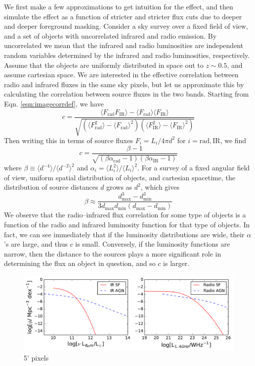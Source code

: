 \documentclass{emulateapj}
\newcommand{\mintext}{\text{min}}
\newcommand{\maxtext}{\text{max}}
\newcommand{\rad}{\text{rad}}
\newcommand{\ir}{\text{IR}}
\begin{document}
We first make a few approximations to get intuition for the effect, and then simulate the effect as a function of stricter and stricter flux cuts due to deeper and deeper foreground masking. Consider a sky survey over a fixed field of view, and a set of objects with uncorrelated infrared and radio emission. By uncorrelated we mean that the infrared and radio luminosities are independent random variables determined by the infrared and radio luminosities, respectively. Assume that the objects are uniformly distributed in space out to $z\sim0.5$, and assume cartesian space. We are interested in the effective correlation between radio and infrared fluxes in the same sky pixels, but let us approximate this by calculating the correlation between source fluxes in the two bands. Starting from Eqn. \ref{eqn:imagecorrdef}, we have
\begin{equation} %
	c = \frac{\langle F_\rad F_\ir \rangle-\langle F_\rad\rangle\langle F_\ir\rangle}{\sqrt{(\langle F_\rad^2\rangle-\langle F_\rad\rangle^2)(\langle F_\ir^2\rangle-\langle F_\ir\rangle^2)}}
\end{equation}
Then writing this in terms of source fluxes $F_i=L_i/4\pi d^2$ for $i=\rad,\ir$, we find
\begin{equation}
	c = \frac{\beta-1}{\sqrt{(\beta\alpha_\rad-1)(\beta\alpha_\ir-1)}}
\end{equation}
where $\beta\equiv\langle d^{-4}\rangle/\langle d^{-2}\rangle^2$ and $\alpha_i=\langle L_i^2\rangle/\langle L_i\rangle^2$.
For a survey of a fixed angular field of view, uniform spatial distribution of objects, and cartesian spacetime, the distribution of source distances $d$ grows as $d^2$, which gives 
\begin{equation}
	\beta\approx\frac{d_\maxtext^3-d_\mintext^3}{3d_\maxtext d_\mintext (d_\maxtext-d_\mintext)}
\end{equation}
We observe that the radio--infrared flux correlation for some type of objects is a function of the radio and infrared luminosity function for that type of objects. In fact, we can see immediately that if the luminosity distributions are wide, their $\alpha$'s are large, and thus $c$ is small. Conversely, if the luminosity functions are narrow, then the distance to the sources plays a more significant role in determining the flux an object in question, and so $c$ is larger. 

\begin{figure}[h]
\centering
\includegraphics[width=6in]{images/sim_rad_ir_luminosity_functions.pdf}
\caption{5' pixels}
\label{fig:luminosityfunctions}
\end{figure}
\end{document}
